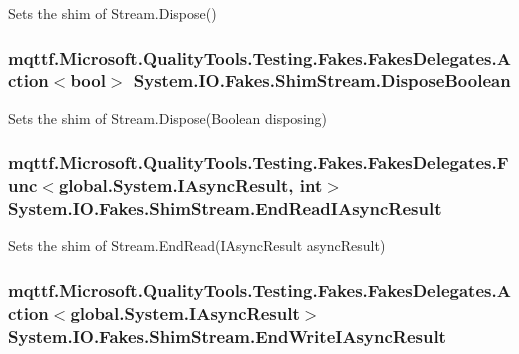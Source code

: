 Sets the shim of Stream.\-Dispose()

\hypertarget{class_system_1_1_i_o_1_1_fakes_1_1_shim_stream_aa9b452cdee2a521df7df2f88096dbc5f}{
\subsubsection[{Dispose\-Boolean}]{\setlength{\rightskip}{0pt plus 5cm}mqttf.\-Microsoft.\-Quality\-Tools.\-Testing.\-Fakes.\-Fakes\-Delegates.\-Action$<$bool$>$ System.\-I\-O.\-Fakes.\-Shim\-Stream.\-Dispose\-Boolean\hspace{0.3cm}{\ttfamily [set]}}}\label{class_system_1_1_i_o_1_1_fakes_1_1_shim_stream_aa9b452cdee2a521df7df2f88096dbc5f}


Sets the shim of Stream.\-Dispose(\-Boolean disposing)

\hypertarget{class_system_1_1_i_o_1_1_fakes_1_1_shim_stream_a0232d3ef63ad7391a7a9b953a2891c51}{
\subsubsection[{End\-Read\-I\-Async\-Result}]{\setlength{\rightskip}{0pt plus 5cm}mqttf.\-Microsoft.\-Quality\-Tools.\-Testing.\-Fakes.\-Fakes\-Delegates.\-Func$<$global.\-System.\-I\-Async\-Result, int$>$ System.\-I\-O.\-Fakes.\-Shim\-Stream.\-End\-Read\-I\-Async\-Result\hspace{0.3cm}{\ttfamily [set]}}}\label{class_system_1_1_i_o_1_1_fakes_1_1_shim_stream_a0232d3ef63ad7391a7a9b953a2891c51}


Sets the shim of Stream.\-End\-Read(\-I\-Async\-Result async\-Result)

\hypertarget{class_system_1_1_i_o_1_1_fakes_1_1_shim_stream_a8683128e851b423cdb82192409fcb9de}{
\subsubsection[{End\-Write\-I\-Async\-Result}]{\setlength{\rightskip}{0pt plus 5cm}mqttf.\-Microsoft.\-Quality\-Tools.\-Testing.\-Fakes.\-Fakes\-Delegates.\-Action$<$global.\-System.\-I\-Async\-Result$>$ System.\-I\-O.\-Fakes.\-Shim\-Stream.\-End\-Write\-I\-Async\-Result\hspace{0.3cm}{\ttfamily [set]}}}\label{class_system_1_1_i_o_1_1_fakes_1_1_shim_stream_a8683128e851b423cdb82192409fcb9de}


